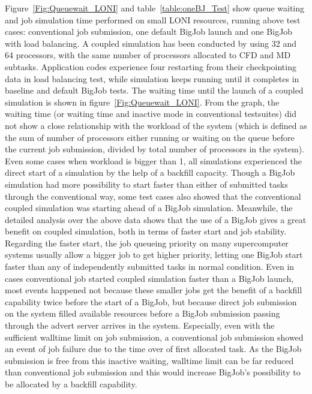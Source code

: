 \documentclass[conference,final]{IEEEtran}
\begin{document}
Figure~\ref{Fig:Queuewait_LONI} and table~\ref{table:oneBJ_Test} show
queue waiting and job simulation time performed on small LONI
resources, running above test cases: conventional job submission, one
default BigJob launch and one BigJob with load balancing. A coupled
simulation has been conducted by using 32 and 64 processors, with the
same number of processors allocated to CFD and MD
subtasks. Application codes experience four restarting from their
checkpointing data in load balancing test, while simulation keeps
running until it completes in baseline and default BigJob tests.  The
waiting time until the launch of a coupled simulation is shown in
figure~\ref{Fig:Queuewait_LONI}. From the graph, the waiting time (or
waiting time and inactive mode in conventional testsuites) did not
show a close relationship with the workload of the system (which is
defined as the sum of number of processors either running or waiting
on the queue before the current job submission, divided by total
number of processors in the system). Even some cases when workload is
bigger than 1, all simulations experienced the direct start of a
simulation by the help of a backfill capacity. Though a BigJob
simulation had more possibility to start faster than either of
submitted tasks through the conventional way, some test cases also
showed that the conventional coupled simulation was starting ahead of
a BigJob simulation.  Meanwhile, the detailed analysis over the above
data shows that the use of a BigJob gives a great benefit on coupled
simulation, both in terms of faster start and job stability. Regarding
the faster start, the job queueing priority on many supercomputer
systems usually allow a bigger job to get higher priority, letting one
BigJob start faster than any of independently submitted tasks in
normal condition. Even in cases conventional job started coupled
simulation faster than a BigJob launch, most events happened not
because these smaller jobs get the benefit of a backfill capability
twice before the start of a BigJob, but because direct job submission
on the system filled available resources before a BigJob submission
passing through the advert server arrives in the system. Especially,
even with the sufficient walltime limit on job submission, a
conventional job submission showed an event of job failure due to the
time over of first allocated task. As the BigJob submission is free
from this inactive waiting, walltime limit can be far reduced than
conventional job submission and this would increase BigJob's
possibility to be allocated by a backfill capability.
\end{document}
